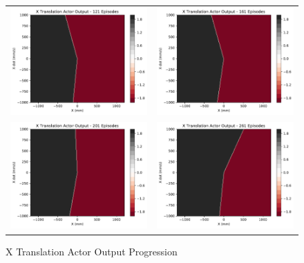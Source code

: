 \begin{figure}[H]
\begin{tabular}{cc}
		\includegraphics[width=65mm]{figures/train_figs/transx_actor/Actor1_121.pdf} &   \includegraphics[width=65mm]{figures/train_figs/transx_actor/Actor1_161.pdf} \\
		\includegraphics[width=65mm]{figures/train_figs/transx_actor/Actor1_201.pdf} &   \includegraphics[width=65mm]{figures/train_figs/transx_actor/Actor1_261.pdf} \\
	\end{tabular}
	\caption{X Translation Actor Output Progression}\label{fig:x_actor_contour}
\end{figure}
